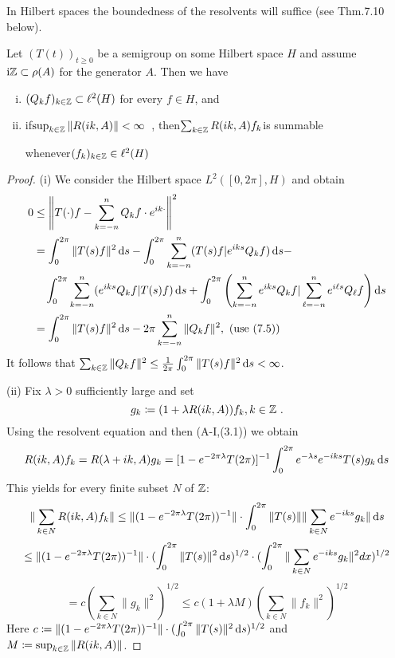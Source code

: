 In Hilbert spaces the boundedness of the resolvents will suffice (see Thm.7.10 below).
\begin{lemma}\label{lem:a3-7.9}
Let $(T(t))_{t\geq 0}$ be a semigroup on some Hilbert space $H$ and assume $\mathrm{i}\mathbb{Z} \subset \rho(A)$ for the generator $A$.
Then we have
\begin{enumerate}[(i)]
\item 
$(Q_{k}f)_{k\in\mathbb{Z}} \subset \ell^{2}(H)$ for every $f \in H$, and

\item 
if\quad $\sup_{k\in\mathbb{Z}}\|R(ik,A)\| < \infty$~, then\quad $\sum_{k\in\mathbb{Z}} R(ik,A)f_{k}$\quad is summable 

whenever\quad $(f_{k})_{k\in\mathbb{Z}} \in \ell^{2}(H)$
\end{enumerate}
\end{lemma}
\begin{proof}
(i) We consider the Hilbert space $L^{2}([0,2\pi],H)$ and obtain
\begin{align*}
0 &\leq \left\|T(\cdot)f - \sum_{k=-n}^{n} Q_{k}f\cdot e^{ik\cdot}\right\|^{2} \\
&= \int_{0}^{2\pi} \|T(s)f\|^{2} \mathop{}\!\mathrm{d}{s} - \int_{0}^{2\pi} \sum_{k=-n}^{n} (T(s)f|e^{iks}Q_{k}f) \mathop{}\!\mathrm{d}{s} - \\
&\quad \int_{0}^{2\pi} \sum_{k=-n}^{n} (e^{iks}Q_{k}f|T(s)f) \mathop{}\!\mathrm{d}{s} + \int_{0}^{2\pi} \left(\sum_{k=-n}^{n} e^{iks}Q_{k}f|\sum_{\ell=-n}^{n} e^{i\ell s}Q_{\ell}f\right) \mathop{}\!\mathrm{d}{s} \\
&= \int_{0}^{2\pi} \|T(s)f\|^{2} \mathop{}\!\mathrm{d}{s} - 2\pi\sum_{k=-n}^{n} \|Q_{k}f\|^{2}, \text{ (use (7.5))}
\end{align*}
It follows that $\sum_{k\in\mathbb{Z}} \|Q_{k}f\|^{2} \leq \frac{1}{2\pi}\int_{0}^{2\pi} \|T(s)f\|^{2} \mathop{}\!\mathrm{d}{s} < \infty$.

(ii) Fix $\lambda > 0$ sufficiently large and set 
\[
g_{k}\coloneqq (1 + \lambda R(ik,A))f_{k}, k \in \mathbb{Z}~.
\]
Using the resolvent equation and then (A-I,(3.1)) we obtain
\[
R(ik,A)f_{k} = R(\lambda + ik,A)g_{k} = [1 - e^{-2\pi\lambda}T(2\pi)]^{-1}\int_{0}^{2\pi} e^{-\lambda s}e^{-iks}T(s)g_{k} \mathop{}\!\mathrm{d}{s}
\]
This yields for every finite subset $N$ of $\mathbb{Z}$:
\[
\|\sum_{k\in N} R(ik,A)f_{k}\| \leq \|(1 - e^{-2\pi\lambda}T(2\pi))^{-1}\|\cdot\int_{0}^{2\pi} \|T(s)\| \|\sum_{k\in N} e^{-iks}g_{k}\| \mathop{}\!\mathrm{d}{s}
\]
\[
\leq \|(1 - e^{-2\pi\lambda}T(2\pi))^{-1}\|\cdot(\int_{0}^{2\pi}\|T(s)\|^{2} \mathop{}\!\mathrm{d}{s})^{1/2} \cdot (\int_{0}^{2\pi}\|\sum_{k\in N} e^{-iks}g_{k}\|^{2} dx)^{1/2}
\]
\[
= c(\sum_{k\in N} \|g_{k}\|^{2})^{1/2} \leq c(1 + \lambda M)(\sum_{k\in N} \|f_{k}\|^{2})^{1/2}
\]
Here $c\coloneqq \|(1 - e^{-2\pi\lambda}T(2\pi))^{-1}\|\cdot(\int_{0}^{2\pi}\|T(s)\|^{2} \mathop{}\!\mathrm{d}{s})^{1/2}$ and $M\coloneqq \sup_{k\in\mathbb{Z}}\|R(ik,A)\|$.
\end{proof}
